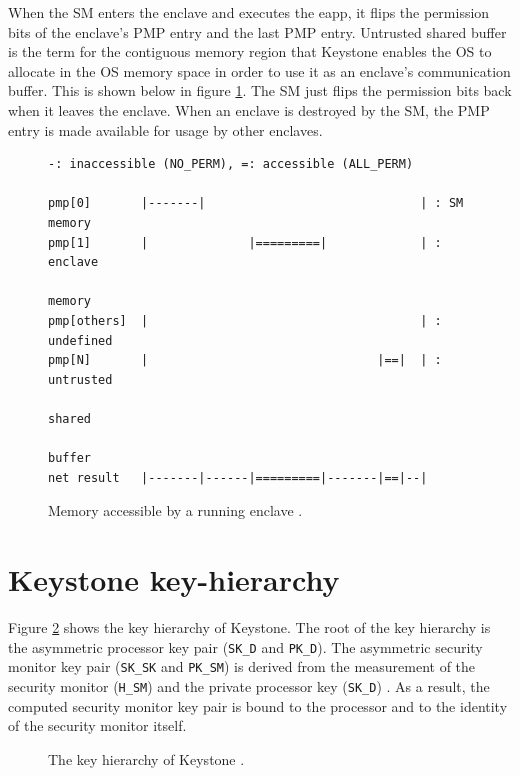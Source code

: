 \noindent
When the SM enters the enclave and executes the eapp, it flips the permission bits of the enclave's PMP entry and the last PMP entry. Untrusted shared buffer is the term for the contiguous memory region that Keystone enables the OS to allocate in the OS memory space in order to use it as an enclave's communication buffer. This is shown below in figure \ref{sm-pmp-4}.
The SM just flips the permission bits back when it leaves the enclave. When an enclave is destroyed by the SM, the PMP entry is made available for usage by other enclaves.
\begin{figure}[H]
\begin{lstlisting}[frame=single,showspaces=true]
-: inaccessible (NO_PERM), =: accessible (ALL_PERM)

pmp[0]       |-------|                              | : SM memory
pmp[1]       |              |=========|             | : enclave 
                                                        memory
pmp[others]  |                                      | : undefined
pmp[N]       |                                |==|  | : untrusted 
                                                        shared 
                                                        buffer
net result   |-------|------|=========|-------|==|--|
\end{lstlisting}
\caption{Memory accessible by a running enclave \cite{keystone-doc}. \label{sm-pmp-4}}
\end{figure}


\section{Keystone key-hierarchy}
Figure \ref{keystone-key-hierarchy} shows the key hierarchy of Keystone. The root of the key hierarchy is the asymmetric processor key pair (\texttt{SK\_D} and  \texttt{PK\_D}). The asymmetric security monitor key pair (\texttt{SK\_SK} and \texttt{PK\_SM}) is derived from the measurement of the security monitor (\texttt{H\_SM}) and the private processor key (\texttt{SK\_D}) \cite{keystone-doc}.
As a result, the computed security monitor key pair is bound to the processor and to the identity of the security monitor itself.

\begin{figure}[h!]
    \centering
    
    \caption{The key hierarchy of Keystone \cite{keystone-doc}.}
    \label{keystone-key-hierarchy}
\end{figure}
